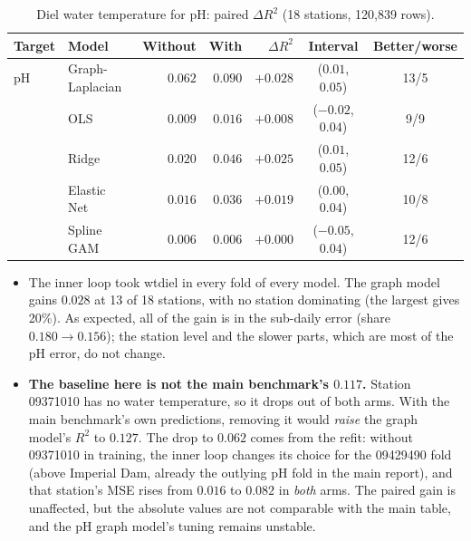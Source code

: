 \documentclass[11pt]{article}
\newcommand{\codeus}{\textunderscore\allowbreak}
\newcommand{\code}[1]{{\ttfamily\let\_\codeus #1}}
\begin{document}
\begin{table}[h]
\centering
\small
\caption{Diel water temperature for pH: paired $\Delta R^2$ (18 stations, 120{,}839 rows).}
\label{tab:phdiel}
\begin{tabular}{ll rrrcc}
\toprule
Target & Model & Without & With & $\Delta R^2$ & Interval & Better/worse \\
\midrule
pH            & Graph-Laplacian & $0.062$ & $0.090$ & $\mathbf{+0.028}$ & ($0.01$, $0.05$) & 13/5 \\
              & OLS             & $0.009$ & $0.016$ & $+0.008$ & ($-0.02$, $0.04$) & 9/9 \\
              & Ridge           & $0.020$ & $0.046$ & $\mathbf{+0.025}$ & ($0.01$, $0.05$) & 12/6 \\
              & Elastic Net     & $0.016$ & $0.036$ & $\mathbf{+0.019}$ & ($0.00$, $0.04$) & 10/8 \\
              & Spline GAM      & $0.006$ & $0.006$ & $+0.000$ & ($-0.05$, $0.04$) & 12/6 \\
\bottomrule
\end{tabular}
\end{table}

\begin{itemize}
  \item The inner loop took \code{wt\_diel} in every fold of every model. The graph model gains
        $0.028$ at 13 of 18 stations, with no station dominating (the largest gives 20\%). As
        expected, all of the gain is in the sub-daily error (share $0.180\to0.156$); the station
        level and the slower parts, which are most of the pH error, do not change.
  \item \textbf{The baseline here is not the main benchmark's $0.117$.} Station 09371010 has no
        water temperature, so it drops out of both arms. With the main benchmark's own
        predictions, removing it would \emph{raise} the graph model's $R^2$ to $0.127$. The
        drop to $0.062$ comes from the refit: without 09371010 in training, the inner loop
        changes its choice for the 09429490 fold (above Imperial Dam, already the outlying pH
        fold in the main report), and that station's MSE rises from $0.016$ to $0.082$ in
        \emph{both} arms. The paired gain is unaffected, but the absolute values are not
        comparable with the main table, and the pH graph model's tuning remains unstable.
\end{itemize}

\end{document}
